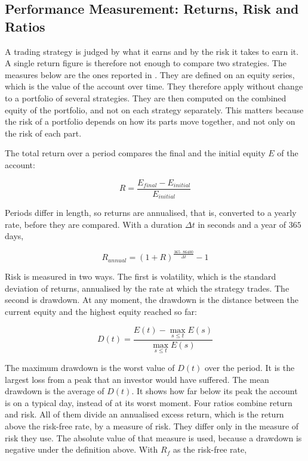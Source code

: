 \subsection{Performance Measurement: Returns, Risk and Ratios}
\label{Section:PerformanceMeasurement}

A trading strategy is judged by what it earns and by the risk it takes to earn it. A single return figure is therefore not enough to compare two strategies. The measures below are the ones reported in . They are defined on an equity series, which is the value of the account over time. They therefore apply without change to a portfolio of several strategies. They are then computed on the combined equity of the portfolio, and not on each strategy separately. This matters because the risk of a portfolio depends on how its parts move together, and not only on the risk of each part.

The total return over a period compares the final and the initial equity $E$ of the account:

\begin{equation}
R = \frac{E_{final} - E_{initial}}{E_{initial}}
\end{equation}

Periods differ in length, so returns are annualised, that is, converted to a yearly rate, before they are compared. With a duration $\Delta t$ in seconds and a year of $365$ days,

\begin{equation}
R_{annual} = (1 + R)^{\frac{365 \cdot 86400}{\Delta t}} - 1
\label{Equation:AnnualizedReturn}
\end{equation}

Risk is measured in two ways. The first is volatility, which is the standard deviation of returns, annualised by the rate at which the strategy trades. The second is drawdown. At any moment, the drawdown is the distance between the current equity and the highest equity reached so far:

\begin{equation}
D(t) = \frac{E(t) - \max_{s \leq t} E(s)}{\max_{s \leq t} E(s)}
\label{Equation:Drawdown}
\end{equation}

The maximum drawdown is the worst value of $D(t)$ over the period. It is the largest loss from a peak that an investor would have suffered. The mean drawdown is the average of $D(t)$. It shows how far below its peak the account is on a typical day, instead of at its worst moment. Four ratios combine return and risk. All of them divide an annualised excess return, which is the return above the risk-free rate, by a measure of risk. They differ only in the measure of risk they use. The absolute value of that measure is used, because a drawdown is negative under the definition above. With $R_f$ as the risk-free rate,


